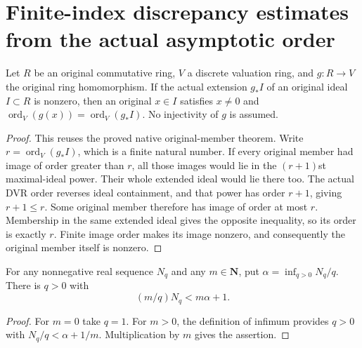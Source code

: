 \section{Finite-index discrepancy estimates from the actual asymptotic order}

\begin{lemma}
\label{lem:c0n-original-member-attains-mapped-dvr-order}
\leanok
Let $R$ be an original commutative ring, $V$ a discrete valuation ring,
and $g:R\to V$ the original ring homomorphism.  If the actual extension
$g_*I$ of an original ideal $I\subset R$ is nonzero, then an original
$x\in I$ satisfies $x\ne0$ and
$\operatorname{ord}_V(g(x))=\operatorname{ord}_V(g_*I)$.
No injectivity of $g$ is assumed.
\end{lemma}
\begin{proof}
This reuses the proved native original-member theorem.  Write
$r=\operatorname{ord}_V(g_*I)$, which is a finite natural number.
If every original member had image of order greater than $r$, all those
images would lie in the $(r+1)$st maximal-ideal power.  Their whole
extended ideal would lie there too.  The actual DVR order reverses ideal
containment, and that power has order $r+1$, giving $r+1\le r$.
Some original member therefore has image of order at most $r$.
Membership in the same extended ideal gives the opposite inequality,
so its order is exactly $r$.  Finite image order makes its image nonzero,
and consequently the original member itself is nonzero.
\end{proof}

\begin{lemma}
\label{lem:c0n-finite-index-infimum}
\leanok
For any nonnegative real sequence $N_q$ and any $m\in\mathbf N$, put
$\alpha=\inf_{q>0}N_q/q$.  There is $q>0$ with
\[
 (m/q)N_q<m\alpha+1.
\]
\end{lemma}
\begin{proof}
For $m=0$ take $q=1$.  For $m>0$, the definition of infimum provides
$q>0$ with $N_q/q<\alpha+1/m$.  Multiplication by $m$ gives the assertion.
\end{proof}

